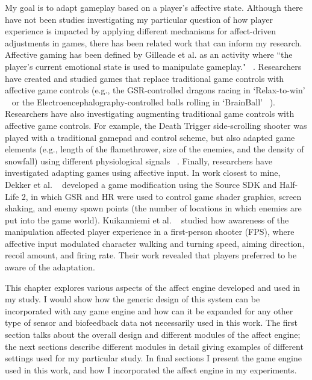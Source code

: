 
My goal is to adapt gameplay based on a player's affective state. Although there have not been studies investigating my particular question of how player experience is impacted by applying different mechanisms for affect-driven adjustments in games, there has been related work that can inform my research. Affective gaming has been defined by Gilleade et al. as an activity where ``the player's current emotional state is used to manipulate gameplay." ~\cite{gilleade2005affective}. Researchers have created and studied games that replace traditional game controls with affective game controls (e.g., the GSR-controlled dragons racing in `Relax-to-win' ~\cite{bersak2001intelligent} or the Electroencephalography-controlled balls rolling in `BrainBall' ~\cite{hjelm2003research}). Researchers have also investigating augmenting traditional game controls with affective game controls. For example, the Death Trigger side-scrolling shooter was played with a traditional gamepad and control scheme, but also adapted game elements (e.g., length of the flamethrower, size of the enemies, and the density of snowfall) using different physiological signals ~\cite{nacke2011biofeedback}. Finally, researchers have investigated adapting games using affective input. In work closest to mine, Dekker et al. ~\cite{dekker2007please} developed a game modification using the Source SDK and Half-Life 2, in which GSR and HR were used to control game shader graphics, screen shaking, and enemy spawn points (the number of locations in which enemies are put into the game world).  Kuikanniemi et al. ~\cite{kuikkaniemi2010influence} studied how awareness of the manipulation affected player experience in a first-person shooter (FPS), where affective input modulated character walking and turning speed, aiming direction, recoil amount, and firing rate. Their work revealed that players preferred to be aware of the adaptation.

This chapter explores various aspects of the affect engine developed and used in my study. I would show how the generic design of this system can be incorporated with any game engine and how can it be expanded for any other type of sensor and biofeedback data not necessarily used in this work. The first section talks about the overall design and different modules of the affect engine; the next sections describe different modules in detail giving examples of different settings used for my particular study. In final sections I present the game engine used in this work, and how I incorporated the affect engine in my experiments.

